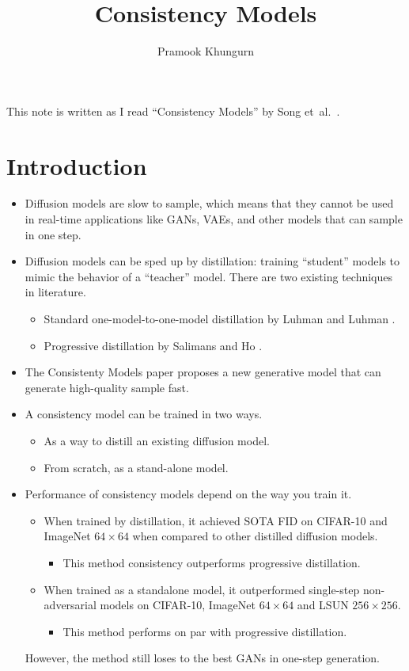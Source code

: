 \documentclass[10pt]{article}
\title{Consistency Models}
\author{Pramook Khungurn}
\newcommand{\etal}{{et~al.}}
\begin{document}
\maketitle

This note is written as I read ``Consistency Models'' by Song \etal~\cite{Song:2023}.

\section{Introduction}

\begin{itemize}
  \item Diffusion models are slow to sample, which means that they cannot be used in real-time applications like GANs, VAEs, and other models that can sample in one step.
  
  \item Diffusion models can be sped up by distillation: training ``student'' models to mimic the behavior of a ``teacher'' model. There are two existing techniques in literature.
  \begin{itemize}
    \item Standard one-model-to-one-model distillation by Luhman and Luhman \cite{Luhman:2021}.
    \item Progressive distillation by Salimans and Ho \cite{Salimans:2022}.
  \end{itemize}

  \item The Consistenty Models paper proposes a new generative model that can generate high-quality sample fast.

  \item A consistency model can be trained in two ways.
  \begin{itemize}
    \item As a way to distill an existing diffusion model.
    \item From scratch, as a stand-alone model.
  \end{itemize}

  \item Performance of consistency models depend on the way you train it.
  \begin{itemize}
    \item When trained by distillation, it achieved SOTA FID on CIFAR-10 and ImageNet $64\times64$ when compared to other distilled diffusion models.
    \begin{itemize}
      \item This method consistency outperforms progressive distillation.
    \end{itemize}
    \item When trained as a standalone model, it outperformed single-step non-adversarial models on CIFAR-10, ImageNet $64 \times 64$ and LSUN $256 \times 256$.
    \begin{itemize}      
      \item This method performs on par with progressive distillation.       
    \end{itemize}    
  \end{itemize}
  However, the method still loses to the best GANs in one-step generation.


\end{itemize}
\end{document}
